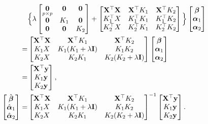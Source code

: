 \documentclass[11pt]{report}
\def\bI{{\bf I}}
\def\bX{{\bf X}}
\def\by{{\bf y}}
\def\bzero{{\bf 0}}
\def\bbeta{{\boldsymbol \beta}}
\def\balpha{{\boldsymbol \alpha}}
\begin{document}
\begin{align*}
&\Big\{\lambda \begin{bmatrix}
\underset{p\times p}{\bzero} & \bzero &\bzero \\ 
\bzero & K_1 & \bzero\\ 
\bzero & \bzero & K_2
\end{bmatrix}+\begin{bmatrix}
\bX^\top \bX & \bX^\top K_1 &\bX^\top K_2 \\ 
K_1^\top X & K_1^\top K_1 & K_1^\top K_2\\ 
K_2^\top X & K_2^\top K_1 & K_2^\top K_2
\end{bmatrix} \Big\} \begin{bmatrix}
\bbeta \\ 
\balpha_1 \\ 
\balpha_2
\end{bmatrix}\\
=&\begin{bmatrix}
\bX^\top \bX & \bX^\top K_1 &\bX^\top K_2 \\ 
K_1 X & K_1( K_1+\lambda \bI) & K_1 K_2\\ 
K_2 X & K_2 K_1 & K_2( K_2+\lambda \bI)
\end{bmatrix}\begin{bmatrix}
\bbeta \\ 
\balpha_1 \\ 
\balpha_2
\end{bmatrix}\\
=&\begin{bmatrix}
\bX^\top \by \\ 
K_1 \by \\ 
K_2 \by
\end{bmatrix},\\
\begin{bmatrix}
\hat{\bbeta} \\ 
\hat{\balpha}_1 \\ 
\hat{\balpha}_2
\end{bmatrix}=&\begin{bmatrix}
\bX^\top \bX & \bX^\top K_1 &\bX^\top K_2 \\ 
K_1 X & K_1( K_1+\lambda \bI) & K_1 K_2\\ 
K_2 X & K_2 K_1 & K_2( K_2+\lambda \bI)
\end{bmatrix}^{-1}\begin{bmatrix}
\bX^\top \by \\ 
K_1 \by \\ 
K_2 \by
\end{bmatrix}.
\end{align*}
\end{document}
